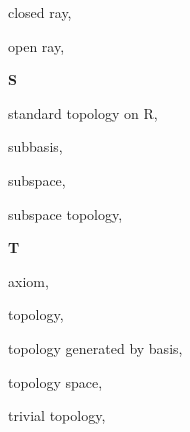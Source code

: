 \begin{multicols}{2}
\hspace{2em}closed ray, \pageref{def:Ray}

\hspace{2em}open ray, \pageref{def:Ray}

\vspace{1em}\large{\textbf{S}}

standard topology on R, \pageref{def:StandardTopologyOnTheRealLine}

subbasis, \pageref{def:Subbasis}

subspace, \pageref{def:SubspaceTopology}

subspace topology, \pageref{def:SubspaceTopology}

\vspace{1em}\large{\textbf{T}}

 axiom, \pageref{def:T1Axiom}

topology, \pageref{def:Topology}

topology generated by basis, \pageref{def:TopologyGeneratedByBasis}

topology space, \pageref{def:TopologySpace}

trivial topology, \pageref{def:TrivialTopology}

\end{multicols}